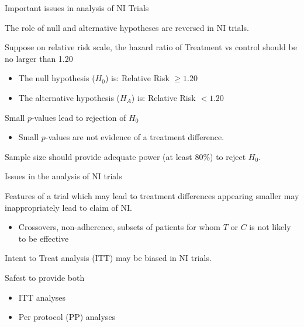 \documentclass[ignorenonframetext,]{beamer}
\providecommand{\tightlist}{%
  \setlength{\itemsep}{0pt}\setlength{\parskip}{0pt}}
\begin{document}
\begin{frame}{%
\protect\hypertarget{important-issues-in-analysis-of-ni-trials}{%
Important issues in analysis of NI Trials}}

The role of null and alternative hypotheses are reversed in NI trials.

Suppose on relative risk scale, the hazard ratio of Treatment vs control
should be no larger than 1.20

\begin{itemize}
\item
  The null hypothesis (\(H_0\)) is: Relative Risk \(\ge 1.20\)
\item
  The alternative hypothesis (\(H_A\)) is: Relative Risk \(< 1.20\)
\end{itemize}

Small \(p\)-values lead to rejection of \(H_0\)

\begin{itemize}
\tightlist
\item
  Small \(p\)-values are not evidence of a treatment difference.
\end{itemize}

Sample size should provide adequate power (at least 80\%) to reject
\(H_0\).

\end{frame}

\begin{frame}{%
\protect\hypertarget{issues-in-the-analysis-of-ni-trials}{%
Issues in the analysis of NI trials}}

Features of a trial which may lead to treatment differences appearing
smaller may inappropriately lead to claim of NI.

\begin{itemize}
\tightlist
\item
  Crossovers, non-adherence, subsets of patients for whom \(T\) or \(C\)
  is not likely to be effective
\end{itemize}

Intent to Treat analysis (ITT) may be biased in NI trials.

Safest to provide both

\begin{itemize}
\item
  ITT analyses
\item
  Per protocol (PP) analyses
\end{itemize}

\end{frame}
\end{document}
